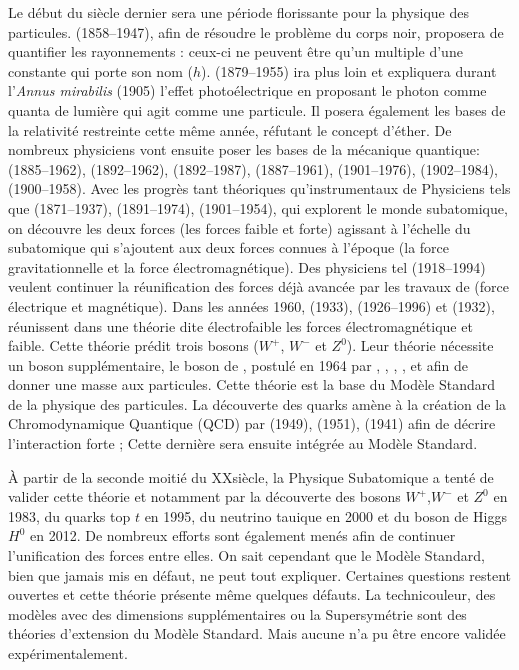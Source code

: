 Le début du siècle dernier sera une période florissante pour la physique des particules.  (\num{1858}--\num{1947}), afin de résoudre le problème du corps noir, proposera de quantifier les rayonnements : ceux-ci ne peuvent être qu'un multiple d'une constante qui porte son nom ($h$).  (\num{1879}--\num{1955}) ira plus loin et expliquera durant l'\textit{Annus mirabilis} (\num{1905}) l'effet photoélectrique en proposant le photon comme quanta de lumière qui agit comme une particule. Il posera également les bases de la relativité restreinte cette même année, réfutant le concept d'éther. De nombreux physiciens vont ensuite poser les bases de la mécanique quantique:  (\num{1885}--\num{1962}),  (\num{1892}--\num{1962}),  (\num{1892}--\num{1987}),  (\num{1887}--\num{1961}),  (\num{1901}--\num{1976}),  (\num{1902}--\num{1984}),  (\num{1900}--\num{1958}). Avec les progrès tant théoriques qu'instrumentaux de Physiciens tels que  (\num{1871}--\num{1937}),  (\num{1891}--\num{1974}),  (\num{1901}--\num{1954}), qui explorent le monde subatomique, on découvre les deux forces (les forces faible et forte) agissant à l'échelle du subatomique qui s'ajoutent aux deux forces connues à l'époque (la force gravitationnelle et la force électromagnétique). Des physiciens tel  (\num{1918}--\num{1994}) veulent continuer la réunification des forces déjà avancée par les travaux de  (force électrique et magnétique). Dans les années \num{1960},  (\num{1933}),  (\num{1926}--\num{1996}) et  (\num{1932}), réunissent dans une théorie dite électrofaible les forces électromagnétique et faible. Cette théorie prédit trois bosons ($W^{+}$, $W^{-}$ et $Z^{0}$). Leur théorie nécessite un boson supplémentaire, le boson de , postulé en \num{1964} par , , , ,  et  afin de donner une masse aux particules. Cette théorie est la base du Modèle Standard de la physique des particules. La découverte des quarks amène à la création de la Chromodynamique Quantique (QCD) par  (\num{1949}),  (\num{1951}),  (\num{1941}) afin de décrire l'interaction forte ; Cette dernière sera ensuite intégrée au Modèle Standard.

À partir de la seconde moitié du XX\ieme siècle, la Physique Subatomique a tenté de valider cette théorie et notamment par la découverte des bosons  $W^{+}$,$W^{-}$ et $Z^{0}$ en \num{1983}, du quarks top $t$ en \num{1995}, du neutrino tauique en \num{2000} et du boson de Higgs $H^{0}$ en \num{2012}. De nombreux efforts sont également menés afin de continuer l'unification des forces entre elles. On sait cependant que le Modèle Standard, bien que jamais mis en défaut, ne peut tout expliquer. Certaines questions restent ouvertes et cette théorie présente même quelques défauts. La technicouleur, des modèles avec des dimensions supplémentaires ou la Supersymétrie sont des théories d'extension du Modèle Standard. Mais aucune n'a pu être encore validée expérimentalement.

